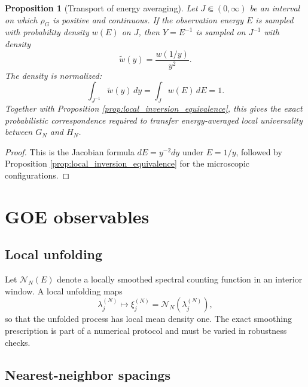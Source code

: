 \documentclass[11pt]{amsart}
\numberwithin{equation}{section}
\theoremstyle{plain}
\newtheorem{proposition}[theorem]{Proposition}
\theoremstyle{definition}
\theoremstyle{remark}
\begin{document}
\begin{proposition}[Transport of energy averaging]
\label{prop:energy_weight_transport}
Let $J\Subset(0,\infty)$ be an interval on which $\rho_G$ is positive and continuous.  If the observation energy $E$ is sampled with probability density $w(E)$ on $J$, then $Y=E^{-1}$ is sampled on $J^{-1}$ with density
\begin{equation}
\widetilde w(y)=\frac{w(1/y)}{y^2}.
\label{eq:inverse_energy_weight}
\end{equation}
The density is normalized:
\begin{equation}
\int_{J^{-1}}\widetilde w(y)\,dy=\int_J w(E)\,dE=1.
\end{equation}
Together with Proposition \ref{prop:local_inversion_equivalence}, this gives the exact probabilistic correspondence required to transfer energy-averaged local universality between $G_N$ and $H_N$.
\end{proposition}

\begin{proof}
This is the Jacobian formula $dE=y^{-2}dy$ under $E=1/y$, followed by Proposition \ref{prop:local_inversion_equivalence} for the microscopic configurations.
\end{proof}

\section{GOE observables}
\label{sec:goe_observables}

\subsection{Local unfolding}
\label{subsec:unfolding}

Let $\mathcal N_N(E)$ denote a locally smoothed spectral counting function in an interior window.  A local unfolding maps
\begin{equation}
\lambda_j^{(N)}\longmapsto
\xi_j^{(N)}=\mathcal N_N\!\left(\lambda_j^{(N)}\right),
\label{eq:local_unfolding}
\end{equation}
so that the unfolded process has local mean density one.  The exact smoothing prescription is part of a numerical protocol and must be varied in robustness checks.

\subsection{Nearest-neighbor spacings}
\label{subsec:nearest_neighbor}
\end{document}
